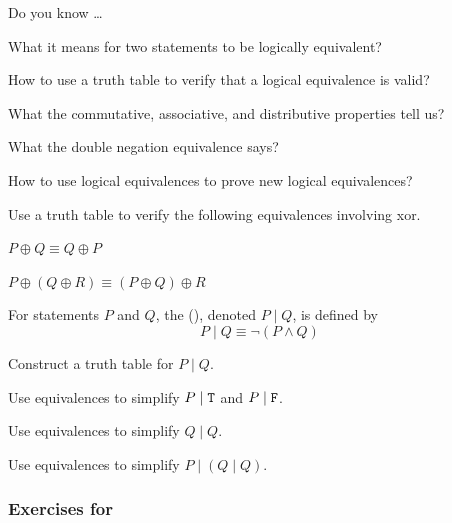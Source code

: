 \begin{exer}[\exerR] %
\label{exer_dyk_logical_equiv}
    Do you know \ldots
        \begin{exerpart}
            \item What it means for two statements to be logically equivalent?
            \item How to use a truth table to verify that a logical equivalence is valid?
            \item What the commutative, associative, and distributive properties tell us? 
            \item What the double negation equivalence says? 
            \item How to use logical equivalences to prove new logical equivalences?
        \end{exerpart}
\end{exer}

\begin{exer}[\exerE] %
\label{exer_equiv_xor}
    Use a truth table to verify the following equivalences involving xor.
        \begin{exerpart}
            \item {} $P \oplus Q \equiv Q \oplus P$
            \item {} $ P \oplus (Q \oplus R) \equiv (P \oplus Q) \oplus R$
        \end{exerpart}
\end{exer}

\begin{exer}[\exerE] %
\label{exer_sheffer_stroke}
    For statements $P$ and $Q$, the  (), denoted $P \mid Q$, is defined by $$P \mid Q \equiv \neg (P \land Q)$$
        \begin{exerpart}
            \item Construct a truth table for $P \mid Q$.
            \item Use equivalences to simplify $P \mid \texttt{T}$ and $P \mid \texttt{F}$.
            \item Use equivalences to simplify $Q \mid Q$.
            \item Use equivalences to simplify $P \mid (Q \mid Q)$.
        \end{exerpart}
\end{exer}


\subsubsection*{Exercises for  \subneg}


